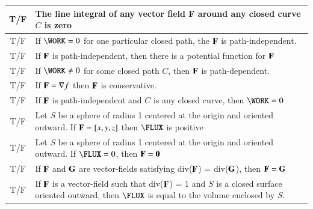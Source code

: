 \documentclass[11pt]{article}
\begin{document}
	\setlength{\extrarowheight}{0.2cm}
	\begin{tabular}{| c | p{17.2cm} |}
		\hline
		T\quad/\quad F & The line integral of any vector field {\bf F} around any closed curve $C$ is zero\\
		\hline
		T\quad/\quad F & If $\WORK = 0$ for one particular closed path, the ${\bf F}$ is path-independent.\\
		\hline
		T\quad/\quad F & If ${\bf F}$ is path-independent, then there is a potential function for ${\bf F}$\\
		\hline
		T\quad/\quad F & If $\WORK \ne 0$ for some closed path $C$, then ${\bf F}$ is path-dependent.\\
		\hline
		T\quad/\quad F & If ${\bf F} = \nabla f$ then ${\bf F}$ is conservative.\\
		\hline
		T\quad/\quad F & If ${\bf F}$ is path-independent and $C$ is any closed curve, then $\WORK = 0$\\
		\hline
		T\quad/\quad F & Let $S$ be a sphere of radius 1 centered at the origin and oriented outward.  If ${\bf F} = [x,y,z]$ then $\FLUX$ is positive\\
		\hline
		T\quad/\quad F & Let $S$ be a sphere of radius 1 centered at the origin and oriented outward.  If $\FLUX = 0$, then ${\bf F} = {\bf 0}$\\
		\hline
		T\quad/\quad F & If ${\bf F}$ and ${\bf G}$ are vector-fields satisfying div(${\bf F}$) = div(${\bf G}$), then ${\bf F} = {\bf G}$\\
		\hline
		T\quad/\quad F & If ${\bf F}$ is a vector-field such that div(${\bf F}$) = 1 and $S$ is a closed surface oriented outward, then $\FLUX$ is equal to the volume enclosed by $S$.\\
		\hline
	\end{tabular}

\thispagestyle{empty}
\newpage
\thispagestyle{empty}
\end{document}
